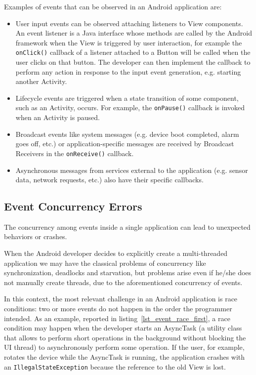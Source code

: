 \documentclass[11pt,a4paper,notitlepage]{article}
\begin{document}
Examples of events that can be observed in an Android application are:
\begin{itemize}
	\item User input events can be observed attaching listeners to View components. An event listener is a Java interface whose methods are called by the Android framework when the View is triggered by user interaction, for example the \texttt{onClick()} callback of a listener attached to a Button will be called when the user clicks on that button. The developer can then implement the callback to perform any action in response to the input event generation, e.g. starting another Activity.
	\item Lifecycle events are triggered when a state transition of some component, such as an Activity, occurs. For example, the \texttt{onPause()} callback is invoked when an Activity is paused.
	\item Broadcast events like system messages (e.g. device boot completed, alarm goes off, etc.) or application-specific messages are received by Broadcast Receivers in the \texttt{onReceive()} callback.
	\item Asynchronous messages from services external to the application (e.g. sensor data, network requests, etc.) also have their specific callbacks.
\end{itemize}

\subsection{Event Concurrency Errors}
The concurrency among events inside a single application can lead to unexpected behaviors or crashes.

When the Android developer decides to explicitly create a multi-threaded application we may have the classical problems of concurrency like synchronization, deadlocks and starvation, but problems arise even if he/she does not manually create threads, due to the aforementioned concurrency of events.

In this context, the most relevant challenge in an Android application is race conditions: two or more events do not happen in the order the programmer intended. As an example, reported in listing~\ref{lst_event_race_first}, a race condition may happen when the developer starts an AsyncTask (a utility class that allows to perform short operations in the background without blocking the UI thread) to asynchronously perform some operation. If the user, for example, rotates the device while the AsyncTask is running, the application crashes with an \texttt{IllegalStateException} because the reference to the old View is lost.
\end{document}
